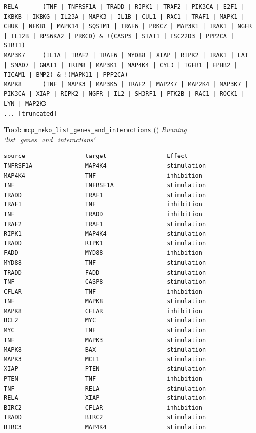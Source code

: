 \documentclass[11pt,a4paper]{article}
\begin{document}
\begin{toolokbox}
\begin{lstlisting}
RELA       (TNF | TNFRSF1A | TRADD | RIPK1 | TRAF2 | PIK3CA | E2F1 | IKBKB | IKBKG | IL23A | MAPK3 | IL1B | CUL1 | RAC1 | TRAF1 | MAPK1 | CHUK | NFKB1 | MAPK14 | SQSTM1 | TRAF6 | PRKCZ | MAP3K1 | IRAK1 | NGFR | IL12B | RPS6KA2 | PRKCD) & !(CASP3 | STAT1 | TSC22D3 | PPP2CA | SIRT1)
MAP3K7     (IL1A | TRAF2 | TRAF6 | MYD88 | XIAP | RIPK2 | IRAK1 | LAT | SMAD7 | GNAI1 | TRIM8 | MAP3K1 | MAP4K4 | CYLD | TGFB1 | EPHB2 | TICAM1 | BMP2) & !(MAPK11 | PPP2CA)
MAPK8      (TNF | MAPK3 | MAP3K5 | TRAF2 | MAP2K7 | MAP2K4 | MAP3K7 | PIK3CA | XIAP | RIPK2 | NGFR | IL2 | SH3RF1 | PTK2B | RAC1 | ROCK1 | LYN | MAP2K3 
... [truncated]
\end{lstlisting}
\end{toolokbox}
\begin{toolokbox}
\textbf{Tool:} \texttt{mcp\_neko\_list\_genes\_and\_interactions} (\checkmark)
\textit{Running `list\_genes\_and\_interactions`}
\begin{lstlisting}
source                 target                 Effect
TNFRSF1A               MAP4K4                 stimulation
MAP4K4                 TNF                    inhibition
TNF                    TNFRSF1A               stimulation
TRADD                  TRAF1                  stimulation
TRAF1                  TNF                    inhibition
TNF                    TRADD                  inhibition
TRAF2                  TRAF1                  stimulation
RIPK1                  MAP4K4                 stimulation
TRADD                  RIPK1                  stimulation
FADD                   MYD88                  inhibition
MYD88                  TNF                    stimulation
TRADD                  FADD                   stimulation
TNF                    CASP8                  stimulation
CFLAR                  TNF                    inhibition
TNF                    MAPK8                  stimulation
MAPK8                  CFLAR                  inhibition
BCL2                   MYC                    stimulation
MYC                    TNF                    stimulation
TNF                    MAPK3                  stimulation
MAPK8                  BAX                    stimulation
MAPK3                  MCL1                   stimulation
XIAP                   PTEN                   stimulation
PTEN                   TNF                    inhibition
TNF                    RELA                   stimulation
RELA                   XIAP                   stimulation
BIRC2                  CFLAR                  inhibition
TRADD                  BIRC2                  stimulation
BIRC3                  MAP4K4                 stimulation

\end{lstlisting}
\end{toolokbox}
\end{document}
